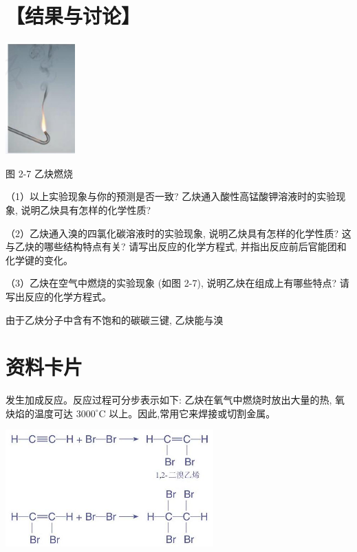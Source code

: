 \documentclass[10pt]{article}
\begin{document}
\section*{【结果与讨论】}

\begin{center}
\includegraphics[max width=0.2\textwidth]{images/0190efc5-b58a-7c43-bfb0-e0a030df9cfd_43_769972.jpg}
\end{center}

图 2-7 乙炔燃烧

（1）以上实验现象与你的预测是否一致? 乙炔通入酸性高锰酸钾溶液时的实验现象, 说明乙炔具有怎样的化学性质?

（2）乙炔通入溴的四氯化碳溶液时的实验现象, 说明乙炔具有怎样的化学性质? 这与乙炔的哪些结构特点有关? 请写出反应的化学方程式, 并指出反应前后官能团和化学键的变化。

（3）乙炔在空气中燃烧的实验现象 (如图 2-7), 说明乙炔在组成上有哪些特点? 请写出反应的化学方程式。

由于乙炔分子中含有不饱和的碳碳三键, 乙炔能与溴

\section*{资料卡片}

发生加成反应。反应过程可分步表示如下: 乙炔在氧气中燃烧时放出大量的热, 氧炔焰的温度可达 \({3000}^{ \circ }\mathrm{C}\) 以上。因此,常用它来焊接或切割金属。

\begin{center}
\includegraphics[max width=0.6\textwidth]{images/0190efc5-b58a-7c43-bfb0-e0a030df9cfd_44_675372.jpg}
\end{center}
\end{document}

